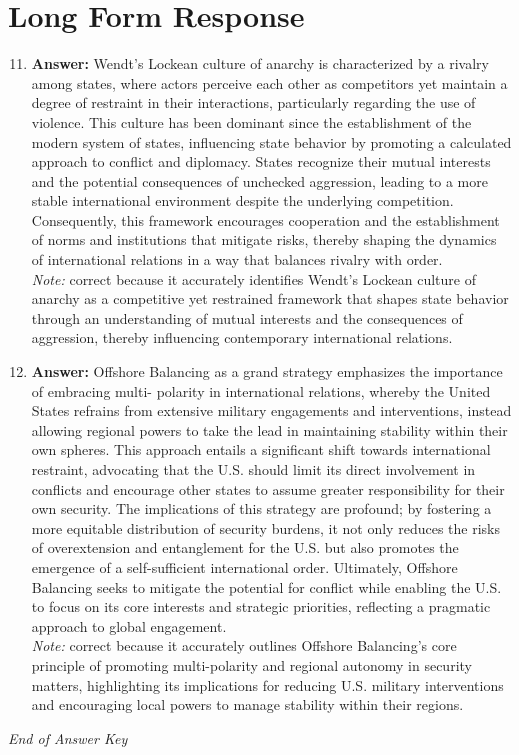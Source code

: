 \documentclass[12pt]{article}
\begin{document}
\section*{Long Form Response}
\begin{enumerate}[label=\arabic*.]
\setcounter{enumi}{10}
\item \textbf{Answer:} Wendt's Lockean culture of anarchy is characterized by a rivalry among states, where actors perceive each other as competitors yet maintain a degree of restraint in their interactions, particularly regarding the use of violence. This culture has been dominant since the establishment of the modern system of states, influencing state behavior by promoting a calculated approach to conflict and diplomacy. States recognize their mutual interests and the potential consequences of unchecked aggression, leading to a more stable international environment despite the underlying competition. Consequently, this framework encourages cooperation and the establishment of norms and institutions that mitigate risks, thereby shaping the dynamics of international relations in a way that balances rivalry with order.
\\ \textit{Note:} correct because it accurately identifies Wendt's Lockean culture of anarchy as a competitive yet restrained framework that shapes state behavior through an understanding of mutual interests and the consequences of aggression, thereby influencing contemporary international relations.
\item \textbf{Answer:} Offshore Balancing as a grand strategy emphasizes the importance of embracing multi- polarity in international relations, whereby the United States refrains from extensive military engagements and interventions, instead allowing regional powers to take the lead in maintaining stability within their own spheres. This approach entails a significant shift towards international restraint, advocating that the U.S. should limit its direct involvement in conflicts and encourage other states to assume greater responsibility for their own security. The implications of this strategy are profound; by fostering a more equitable distribution of security burdens, it not only reduces the risks of overextension and entanglement for the U.S. but also promotes the emergence of a self-sufficient international order. Ultimately, Offshore Balancing seeks to mitigate the potential for conflict while enabling the U.S. to focus on its core interests and strategic priorities, reflecting a pragmatic approach to global engagement.
\\ \textit{Note:} correct because it accurately outlines Offshore Balancing's core principle of promoting multi-polarity and regional autonomy in security matters, highlighting its implications for reducing U.S. military interventions and encouraging local powers to manage stability within their regions.
\end{enumerate}

\vfill
\noindent\textit{End of Answer Key}
\end{document}
